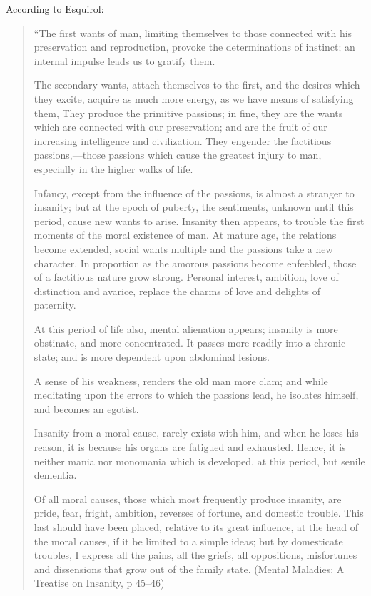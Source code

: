 According to Esquirol:

\begin{quote}

“The first wants of man, limiting themselves to those connected with his preservation and reproduction, provoke the determinations of instinct; an internal impulse leads us to gratify them.

The secondary wants, attach themselves to the first, and the desires which they excite, acquire as much more energy, as we have means of satisfying them, They produce the primitive passions; in fine, they are the wants which are connected with our preservation; and are the fruit of our increasing intelligence and civilization. They engender the factitious passions,—those passions which cause the greatest injury to man, especially in the higher walks of life.

Infancy, except from the influence of the passions, is almost a stranger to insanity; but at the epoch of puberty, the sentiments, unknown until this period, cause new wants to arise. Insanity then appears, to trouble the first moments of the moral existence of man.
At mature age, the relations become extended, social wants multiple and the passions take a new character. In proportion as the amorous passions become enfeebled, those of a factitious nature grow strong. Personal interest, ambition, love of distinction and avarice, replace the charms of love and delights of paternity.

At this period of life also, mental alienation appears; insanity is more obstinate, and more concentrated. It passes more readily into a chronic state; and is more dependent upon abdominal lesions.

A sense of his weakness, renders the old man more clam; and while meditating upon the errors to which the passions lead, he isolates himself, and becomes an egotist.

Insanity from a moral cause, rarely exists with him, and when he loses his reason, it is because his organs are fatigued and exhausted. Hence, it is neither mania nor monomania which is developed, at this period, but senile dementia.

Of all moral causes, those which most frequently produce insanity, are pride, fear, fright, ambition, reverses of fortune, and domestic trouble. This last should have been placed, relative to its great influence, at the head of the moral causes, if it be limited to a simple ideas; but by domesticate troubles, I express all the pains, all the griefs, all oppositions, misfortunes and dissensions that grow out of the family state.
(Mental Maladies: A Treatise on Insanity, p 45--46)
\end{quote}


